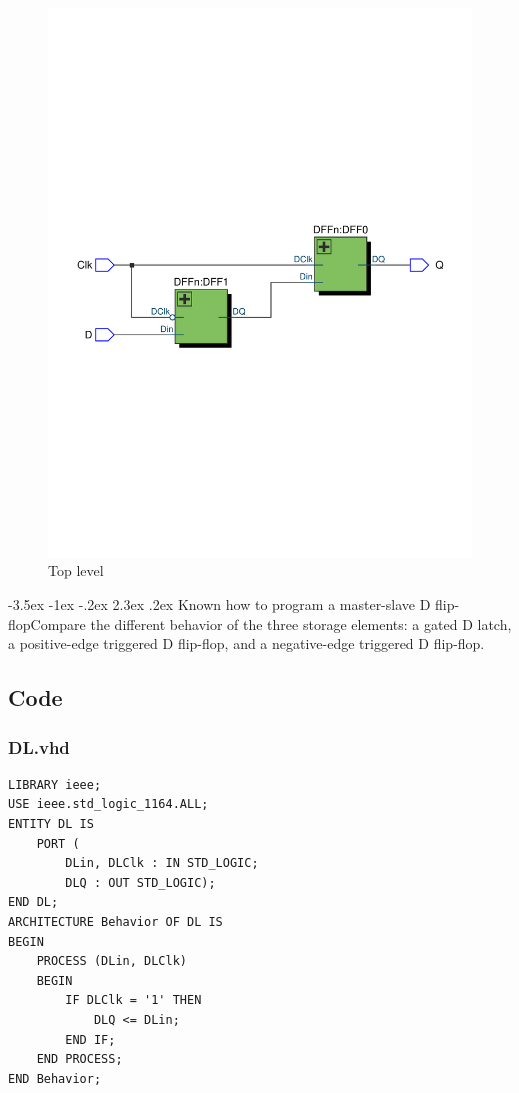 \documentclass[13pt,a4paper]{report}
\makeatletter
\renewcommand\section{\@startsection {section}{1}{-1em}%
  {-3.5ex \@plus -1ex \@minus -.2ex}%
  {2.3ex \@plus.2ex}%
  {\normalfont\Large\bfseries}}
\makeatother
\begin{document}
\begin{figure}[H]
\centering
\includegraphics[scale=0.6, clip, trim={0cm 10cm 0cm 11cm}]{images/Exc4_RTL.pdf}
\caption*{Top level}
\end{figure}

\section{Known how to program a master-slave D flip-flopCompare the different behavior of the three storage elements: a gated D latch, a positive-edge triggered D flip-flop, and a negative-edge triggered D flip-flop.}

\subsection{Code}
\subsubsection{DL.vhd}
\begin{verbatim}
LIBRARY ieee;
USE ieee.std_logic_1164.ALL;
ENTITY DL IS
	PORT (
		DLin, DLClk : IN STD_LOGIC;
		DLQ : OUT STD_LOGIC);
END DL;
ARCHITECTURE Behavior OF DL IS
BEGIN
	PROCESS (DLin, DLClk)
	BEGIN
		IF DLClk = '1' THEN
			DLQ <= DLin;
		END IF;
	END PROCESS;
END Behavior;
\end{verbatim}
\end{document}
